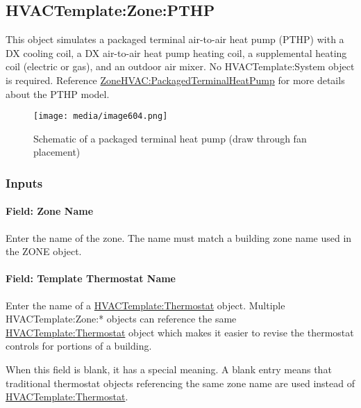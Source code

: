 \subsection{HVACTemplate:Zone:PTHP}\label{hvactemplatezonepthp}

This object simulates a packaged terminal air-to-air heat pump (PTHP) with a DX cooling coil, a DX air-to-air heat pump heating coil, a supplemental heating coil (electric or gas), and an outdoor air mixer. No HVACTemplate:System object is required. Reference \hyperref[zonehvacpackagedterminalheatpump]{ZoneHVAC:PackagedTerminalHeatPump} for more details about the PTHP model.

\begin{figure}[hbtp] %
\centering
\texttt{[image: media/image604.png]}
\caption{Schematic of a packaged terminal heat pump (draw through fan placement) \protect \label{fig:schematic-of-a-packaged-terminal-heat-pump}}
\end{figure}

\subsubsection{Inputs}\label{inputs-5-014}

\paragraph{Field: Zone Name}\label{field-zone-name-4-001}

Enter the name of the zone. The name must match a building zone name used in the ZONE object.

\paragraph{Field: Template Thermostat Name}\label{field-template-thermostat-name-4}

Enter the name of a \hyperref[hvactemplatethermostat]{HVACTemplate:Thermostat} object. Multiple HVACTemplate:Zone:* objects can reference the same \hyperref[hvactemplatethermostat]{HVACTemplate:Thermostat} object which makes it easier to revise the thermostat controls for portions of a building.

When this field is blank, it has a special meaning. A blank entry means that traditional thermostat objects referencing the same zone name are used instead of \hyperref[hvactemplatethermostat]{HVACTemplate:Thermostat}.

